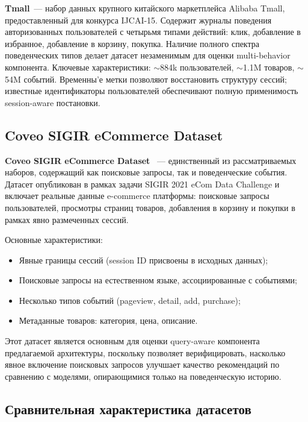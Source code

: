 \textbf{Tmall}~--- набор данных крупного китайского маркетплейса Alibaba Tmall, предоставленный для конкурса IJCAI-15. Содержит журналы поведения авторизованных пользователей с четырьмя типами действий: клик, добавление в избранное, добавление в корзину, покупка. Наличие полного спектра поведенческих типов делает датасет незаменимым для оценки multi-behavior компонента. Ключевые характеристики: $\sim$884k пользователей, $\sim$1.1M товаров, $\sim$54M событий. Временны'е метки позволяют восстановить структуру сессий; известные идентификаторы пользователей обеспечивают полную применимость session-aware постановки.

\subsection{Coveo SIGIR eCommerce Dataset}
\label{subsec:ch1:coveo}

\textbf{Coveo SIGIR eCommerce Dataset} \cite{tagliabue2021coveo}~--- единственный из рассматриваемых наборов, содержащий как поисковые запросы, так и поведенческие события. Датасет опубликован в рамках задачи SIGIR 2021 eCom Data Challenge и включает реальные данные e-commerce платформы: поисковые запросы пользователей, просмотры страниц товаров, добавления в корзину и покупки в рамках явно размеченных сессий.

Основные характеристики:
\begin{itemize}
    \item Явные границы сессий (session ID присвоены в исходных данных);
    \item Поисковые запросы на естественном языке, ассоциированные с событиями;
    \item Несколько типов событий (pageview, detail, add, purchase);
    \item Метаданные товаров: категория, цена, описание.
\end{itemize}

Этот датасет является основным для оценки query-aware компонента предлагаемой архитектуры, поскольку позволяет верифицировать, насколько явное включение поисковых запросов улучшает качество рекомендаций по сравнению с моделями, опирающимися только на поведенческую историю.

\subsection{Сравнительная характеристика датасетов}


